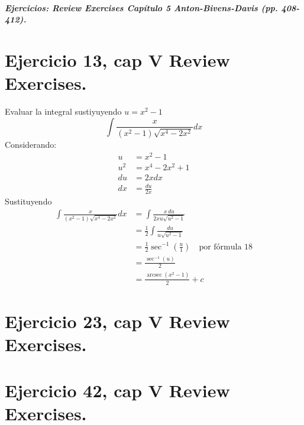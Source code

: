 \documentclass[11pt,letterpaper]{article}
\begin{document}

\subparagraph{Ejercicios: Review Exercises Capítulo 5 Anton-Bivens-Davis (pp. 408-412).}

\section{Ejercicio 13, cap V Review Exercises.}
Evaluar la integral sustiyuyendo $u=x^2-1$
\begin{equation*}
  \int \frac{x}{(x^2-1)\sqrt{x^4-2x^2}}dx
\end{equation*}
Considerando:
\begin{equation*}
  \begin{split}
    u &= x^2-1\\
    u^2 &= x^4-2x^2+1\\
    du &= 2xdx\\
    dx &= \frac{du}{2x}
  \end{split}
\end{equation*}
Sustituyendo
\begin{equation*}
  \begin{split}
    \int \frac{x}{ (x^2-1) \sqrt{x^4-2x^2}} dx &= \int \frac{x\, du}{2x u \sqrt{u^2-1}} \\
    &= \frac{1}{2}\int \frac{du}{u\sqrt{u^2-1}} \\
    &= \frac{1}{2} \operatorname{sec}^{-1}\left(\frac{u}{1}\right) \quad \text{por fórmula 18} \\
    &= \frac{\operatorname{sec}^{-1}(u)}{2} \\
    &= \frac{\operatorname{arcsec}(x^2-1)}{2} + c
  \end{split}
\end{equation*}

\section{Ejercicio 23, cap V Review Exercises.}

\section{Ejercicio 42, cap V Review Exercises.}

\end{document}

